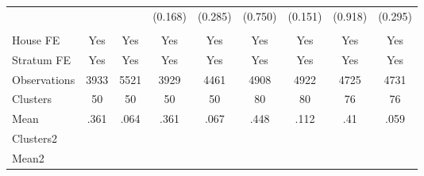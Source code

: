 {\begin{tabular}{l*{8}{c}}
                &         &         &  (0.168)&  (0.285)&  (0.750)&  (0.151)&  (0.918)&  (0.295)\\
                &         &         &         &         &         &         &         &         \\
House FE        &      Yes&      Yes&      Yes&      Yes&      Yes&      Yes&      Yes&      Yes\\
Stratum FE      &      Yes&      Yes&      Yes&      Yes&      Yes&      Yes&      Yes&      Yes\\
\midrule
Observations    &     3933&     5521&     3929&     4461&     4908&     4922&     4725&     4731\\
Clusters        &       50&       50&       50&       50&       80&       80&       76&       76\\
Mean            &     .361&     .064&     .361&     .067&     .448&     .112&      .41&     .059\\
Clusters2       &         &         &         &         &         &         &         &         \\
Mean2           &         &         &         &         &         &         &         &         \\
\bottomrule
\end{tabular}
}
